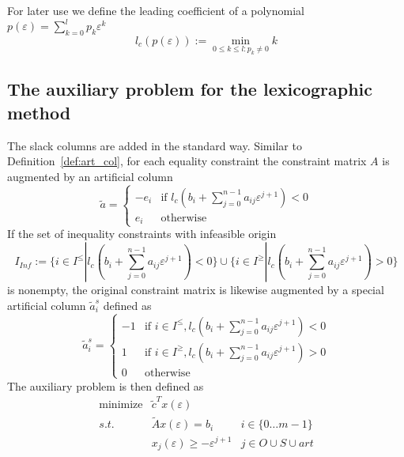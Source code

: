 \documentclass[a4paper]{article}
\begin{document}
For later use we define the leading coefficient of a polynomial 
$p(\varepsilon)=\sum_{k=0}^{l}p_{k}\varepsilon^{k}$
\begin{equation}
\label{def:lead_coeff}
l_{c}(p(\varepsilon)):=\min_{0 \leq k \leq l:p_{k} \neq 0}k 
\end{equation}
  
\subsection{The auxiliary problem for the lexicographic method}
The slack columns are added in the standard way.
Similar to Definition~\ref{def:art_col}, for each equality constraint the
constraint matrix $A$ is augmented by an artificial column
\[
 \tilde{a} =\left\{
	      \begin{array}{ll}
  		-e_{i} &
		 \mbox{if $l_{c}\left(
		  b_{i} + \sum_{j=0}^{n-1}a_{ij}\varepsilon^{j+1}\right)< 0$}\\
		  e_{i}  & \mbox{otherwise}
	      \end{array}
 	     \right.
\]
If the set of inequality constraints with infeasible origin
\[
  I_{Inf}:=\{i \in I^{\leq}\left|\right. l_{c}\left(b_{i} +
    \sum_{j=0}^{n-1}a_{ij}\varepsilon^{j+1}\right) < 0\} \cup
    \{i \in I^{\geq}\left|\right. l_{c}\left(b_{i} +
    \sum_{j=0}^{n-1}a_{ij}\varepsilon^{j+1}\right) > 0\}
\]
is nonempty, the original constraint matrix is likewise augmented by a special
artificial column $\tilde{a}_{i}^{s}$ defined as
\begin{equation}
\tilde{a}^{s}_{i} =\left\{
	             \begin{array}{ll}
  		       -1 & \mbox{if $i \in I^{\leq},
			l_{c}\left(b_{i} +
			 \sum_{j=0}^{n-1}a_{ij}\varepsilon^{j+1}\right) < 0$}\\
		        1 & \mbox{if $i \in I^{\geq},
			l_{c}\left(b_{i} +
			  \sum_{j=0}^{n-1}a_{ij}\varepsilon^{j+1}\right)> 0$}\\
		        0 & \mbox{otherwise}
	             \end{array}
 	           \right.
\end{equation}
The auxiliary problem is then defined as
\begin{eqnarray}
\label{def:aux_prob}
 \mbox{minimize} &  \tilde{c}^{T}x(\varepsilon)   & 	  \nonumber \\
	s.t.	 & \tilde{A}x(\varepsilon) = b_{i} & i \in \{0\ldots m-1\}  \\
		 & x_{j}(\varepsilon) \geq -\varepsilon^{j+1} &
		   j \in O \cup S \cup art \nonumber 
\end{eqnarray}
\end{document}
